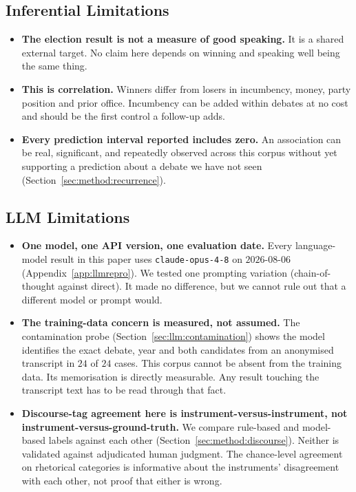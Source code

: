 \documentclass[pdflatex,sn-mathphys-num]{sn-jnl}%
\begin{document}
\subsection{Inferential Limitations}
\begin{itemize}\itemsep2pt
  \item \textbf{The election result is not a measure of good speaking.} It
        is a shared external target. No claim here depends on winning
        and speaking well being the same thing.
  \item \textbf{This is correlation.} Winners differ from losers in
        incumbency, money, party position and prior office. Incumbency can
        be added within debates at no cost and should be the first control
        a follow-up adds.
  \item \textbf{Every prediction interval reported includes zero.} An
        association can be real, significant, and repeatedly observed
        across this corpus without yet supporting a prediction about a
        debate we have not seen (Section~\ref{sec:method:recurrence}).
\end{itemize}

\subsection{LLM Limitations}
\begin{itemize}\itemsep2pt
  \item \textbf{One model, one API version, one evaluation date.} Every
        language-model result in this paper uses \texttt{claude-opus-4-8}
        on $2026$-$08$-$06$ (Appendix~\ref{app:llmrepro}). We tested one
        prompting variation (chain-of-thought against direct). It made
        no difference, but we cannot rule out that a different model or
        prompt would.
  \item \textbf{The training-data concern is measured, not assumed.} The
        contamination probe (Section~\ref{sec:llm:contamination}) shows the
        model identifies the exact debate, year and both candidates from an
        anonymised transcript in $24$ of $24$ cases. This corpus cannot be
        absent from the training data. Its memorisation is directly
        measurable. Any result touching the transcript text has to be
        read through that fact.
  \item \textbf{Discourse-tag agreement here is instrument-versus-instrument,
        not instrument-versus-ground-truth.} We compare rule-based and
        model-based labels against each other
        (Section~\ref{sec:method:discourse}). Neither is validated against
        adjudicated human judgment. The chance-level agreement on
        rhetorical categories is informative about the instruments'
        disagreement with each other, not proof that either is wrong.
\end{itemize}
\end{document}
